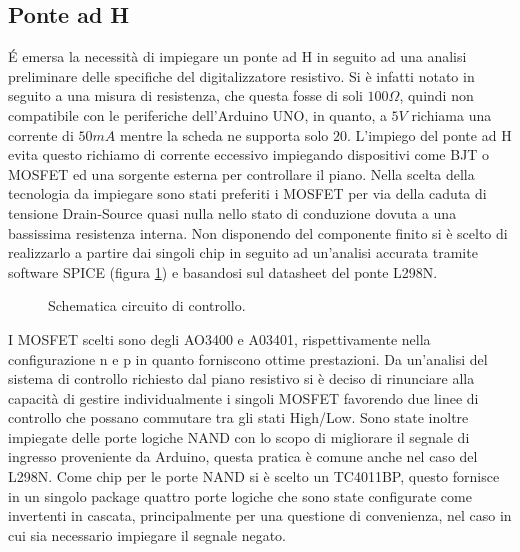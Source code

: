 \documentclass[11pt]{article}
\begin{document}
\subsection{Ponte ad H}\label{hbridge}

É emersa la necessità di impiegare un ponte ad H in seguito ad una analisi preliminare delle specifiche del digitalizzatore resistivo. Si è infatti notato in seguito a una misura di resistenza, che questa fosse di soli $100 \Omega$, quindi non compatibile con le periferiche dell'Arduino UNO, in quanto, a $5V$ richiama una corrente di $50mA$ mentre la scheda ne supporta solo $20$. L'impiego del ponte ad H evita questo richiamo di corrente eccessivo impiegando dispositivi come BJT o MOSFET ed una sorgente esterna per controllare il piano. Nella scelta della tecnologia da impiegare sono stati preferiti i MOSFET per via della caduta di tensione Drain-Source quasi nulla nello stato di conduzione dovuta a una bassissima resistenza interna. Non disponendo del componente finito si è scelto di realizzarlo a partire dai singoli chip in seguito ad un'analisi accurata tramite software SPICE (figura \ref{fig:controllo}) e basandosi sul datasheet del ponte L298N.
\begin{figure}[h!]
\centering
{}
\caption{Schematica circuito di controllo.} \label{fig:controllo}
\end{figure}
I MOSFET scelti sono degli AO3400 e A03401, rispettivamente nella configurazione n e p in quanto forniscono ottime prestazioni. Da un'analisi del sistema di controllo richiesto dal piano resistivo si è deciso di rinunciare alla capacità di gestire individualmente i singoli MOSFET favorendo due linee di controllo che possano commutare tra gli stati High/Low. Sono state inoltre impiegate delle porte logiche NAND con lo scopo di migliorare il segnale di ingresso proveniente da Arduino, questa pratica è comune anche nel caso del L298N. Come chip per le porte NAND si è scelto un TC4011BP, questo fornisce in un singolo package quattro porte logiche che sono state configurate come invertenti in cascata, principalmente per una questione di convenienza, nel caso in cui sia necessario impiegare il segnale negato.
\end{document}

